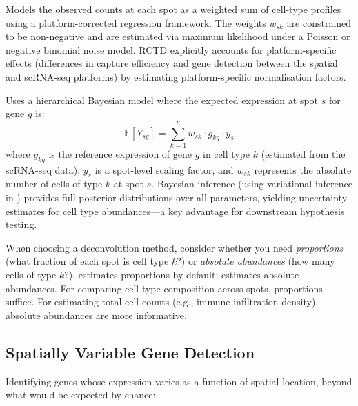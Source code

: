\begin{description}[style=nextline]
  \item[\software{RCTD} formulation] Models the observed counts at each spot
    as a weighted sum of cell-type profiles using a platform-corrected
    regression framework. The weights $w_{sk}$ are constrained to be
    non-negative and are estimated via maximum likelihood under a Poisson or
    negative binomial noise model. RCTD explicitly accounts for
    platform-specific effects (differences in capture efficiency and gene
    detection between the spatial and scRNA-seq platforms) by estimating
    platform-specific normalisation factors.
  \item[\software{cell2location} formulation] Uses a hierarchical Bayesian
    model where the expected expression at spot $s$ for gene $g$ is:
    \begin{equation}
      \label{eq:spatial:cell2loc}
      \mathbb{E}[Y_{sg}] = \sum_{k=1}^{K} w_{sk} \cdot g_{kg} \cdot y_s
    \end{equation}
    where $g_{kg}$ is the reference expression of gene $g$ in cell type $k$
    (estimated from the scRNA-seq data), $y_s$ is a spot-level scaling factor,
    and $w_{sk}$ represents the absolute number of cells of type $k$ at spot
    $s$. Bayesian inference (using variational inference in )
    provides full posterior distributions over all parameters, yielding
    uncertainty estimates for cell type abundances---a key advantage for
    downstream hypothesis testing.
\end{description}

\begin{tipbox}
When choosing a deconvolution method, consider whether you need
\emph{proportions} (what fraction of each spot is cell type $k$?) or
\emph{absolute abundances} (how many cells of type $k$?).
 estimates proportions by default; 
estimates absolute abundances. For comparing cell type composition across spots,
proportions suffice. For estimating total cell counts (e.g., immune infiltration
density), absolute abundances are more informative.
\end{tipbox}

\subsection{Spatially Variable Gene Detection}

Identifying genes whose expression varies as a function of spatial location,
beyond what would be expected by chance:

